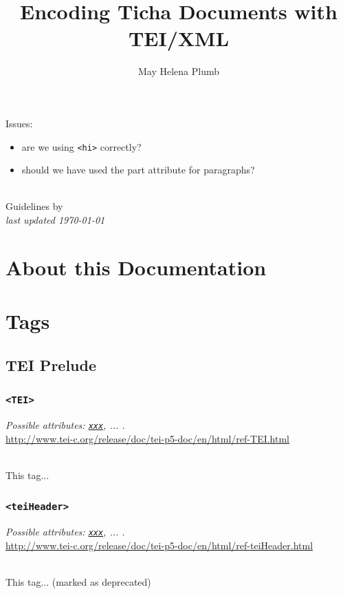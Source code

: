 \documentclass[12pt,a4paper]{article}
\author{May Helena Plumb}
\title{Encoding Ticha Documents with TEI/XML}
\makeatletter
\let\thetitle\@title
\let\theauthor\@author
\newcommand{\taglinks}[2]{
\vspace*{-0.5ex}
\hspace*{\parindent}
\begin{minipage}{\textwidth}
  \emph{Possible attributes: #1.} \\ \url{#2} \end{minipage} \vspace{0.5ex} \\ }
\makeatother
\begin{document}
Issues:
\begin{itemize}
\item are we using \texttt{<hi>} correctly?
\item should we have used the part attribute for paragraphs?
\end{itemize}

\begin{center}
{\large \textbf{\thetitle}} \\
Guidelines by \theauthor \\
\emph{last updated \today}
\end{center}

\tableofcontents	



\section{About this Documentation}

\section{Tags}

\subsection{TEI Prelude}

\subsubsection{\texttt{<TEI>}} \label{tag-sec:TEI}
\taglinks{
\hyperref[att-sec:xxx]{\texttt{xxx}}, ... }
{http://www.tei-c.org/release/doc/tei-p5-doc/en/html/ref-TEI.html}
This tag...

\subsubsection{\texttt{<teiHeader>}} \label{tag-sec:teiHeader}
\taglinks{
\hyperref[att-sec:xxx]{\texttt{xxx}}, ... }
{http://www.tei-c.org/release/doc/tei-p5-doc/en/html/ref-teiHeader.html}
This tag... (marked as deprecated)
\end{document}
